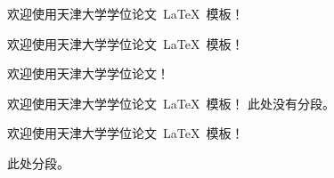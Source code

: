 \documentclass[12pt,openany,oneside]{book}
\begin{document}
\begin{CJK*}{UTF8}{song} %

欢迎使用天津大学学位论文~LaTeX~模板！

欢迎使用天津大学学位论文~\LaTeX~模板！

欢迎使用天津大学学位论文！

欢迎使用天津大学学位论文~\LaTeX~模板！
此处没有分段。

欢迎使用天津大学学位论文~\LaTeX~模板！

此处分段。

\end{CJK*}
\end{document}

